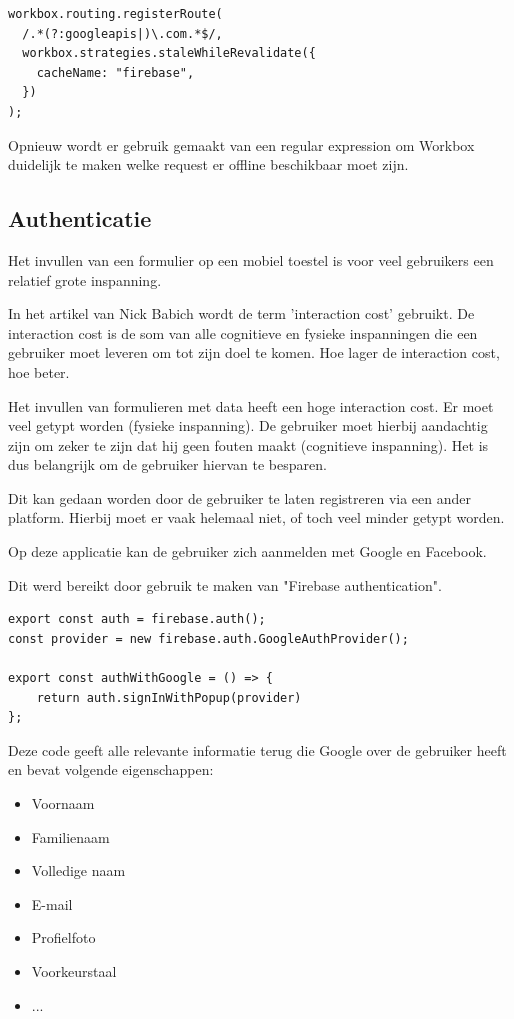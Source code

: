 \begin{lstlisting}
workbox.routing.registerRoute(
  /.*(?:googleapis|)\.com.*$/,
  workbox.strategies.staleWhileRevalidate({
    cacheName: "firebase",
  })
);
\end{lstlisting}
		
		Opnieuw wordt er gebruik gemaakt van een regular expression om Workbox duidelijk te maken welke request er offline beschikbaar moet zijn.

	\subsection{Authenticatie}
		
		Het invullen van een formulier op een mobiel toestel is voor veel gebruikers een relatief grote inspanning.
		
		In het artikel van Nick Babich wordt de term 'interaction cost' gebruikt. De interaction cost is de som van alle cognitieve en fysieke inspanningen die een gebruiker moet leveren om tot zijn doel te komen. Hoe lager de interaction cost, hoe beter.
		\autocite{Babich2018}
		
		Het invullen van formulieren met data heeft een hoge interaction cost. Er moet veel getypt worden (fysieke inspanning). De gebruiker moet hierbij aandachtig zijn om zeker te zijn dat hij geen fouten maakt (cognitieve inspanning). Het is dus belangrijk om de gebruiker hiervan te besparen.
		
		Dit kan gedaan worden door de gebruiker te laten registreren via een ander platform. Hierbij moet er vaak helemaal niet, of toch veel minder getypt worden.
		
		Op deze applicatie kan de gebruiker zich aanmelden met Google en Facebook.
		
		Dit werd bereikt door gebruik te maken van "Firebase authentication".
		
		
\begin{lstlisting}
export const auth = firebase.auth();
const provider = new firebase.auth.GoogleAuthProvider();

export const authWithGoogle = () => {
	return auth.signInWithPopup(provider)
};
\end{lstlisting}
	
		Deze code geeft alle relevante informatie terug die Google over de gebruiker heeft en bevat volgende eigenschappen:
		\begin{itemize}
			\item Voornaam
			\item Familienaam
			\item Volledige naam
			\item E-mail
			\item Profielfoto
			\item Voorkeurstaal
			\item ...
		\end{itemize} 
		
